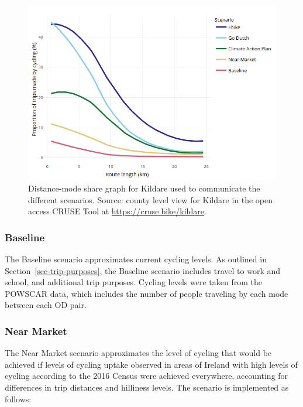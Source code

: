 \documentclass[
  super,
  preprint,
  3p]{elsarticle}
\begin{document}
\begin{figure}

{\centering 

\includegraphics{images/scenarios_kildare.png}

}

\caption{\label{fig-scenarios}Distance-mode share graph for Kildare used
to communicate the different scenarios. Source: county level view for
Kildare in the open access CRUSE Tool at
\url{https://cruse.bike/kildare}.}

\end{figure}

\hypertarget{baseline}{%
\subsubsection{Baseline}\label{baseline}}

The Baseline scenario approximates current cycling levels. As outlined
in Section~\ref{sec-trip-purposes}, the Baseline scenario includes
travel to work and school, and additional trip purposes. Cycling levels
were taken from the POWSCAR data, which includes the number of people
traveling by each mode between each OD pair.

\hypertarget{near-market}{%
\subsubsection{Near Market}\label{near-market}}

The Near Market scenario approximates the level of cycling that would be
achieved if levels of cycling uptake observed in areas of Ireland with
high levels of cycling according to the 2016 Census were achieved
everywhere, accounting for differences in trip distances and hilliness
levels. The scenario is implemented as follows:
\end{document}
